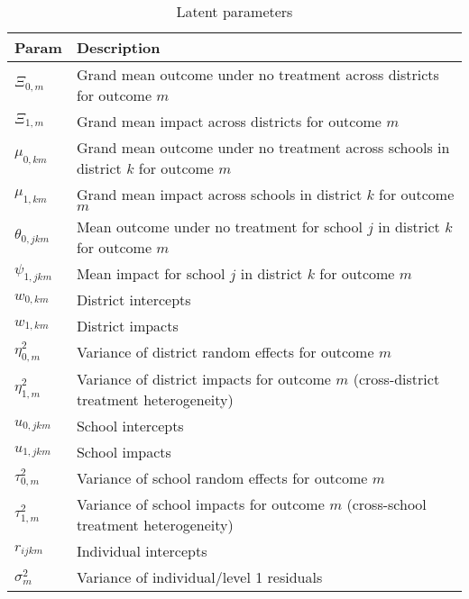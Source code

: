 \documentclass[12pt]{article}
\begin{document}
\begin{table}[p]
\begin{tabular}{p{1.5cm} | p{16cm}}
Param											& Description \\ \hline
$\Xi_{0,m}$ 									& Grand mean outcome under no treatment across districts for outcome $m$\\
$\Xi_{1,m}$										& Grand mean impact across districts for outcome $m$\\
$\mu_{0,km}$									& Grand mean outcome under no treatment across schools in district $k$ for outcome $m$\\
$\mu_{1,km}$									& Grand mean impact across schools in district $k$ for outcome $m$\\
$\theta_{0,jkm}$								& Mean outcome under no treatment for school $j$ in district $k$ for outcome $m$\\
$\psi_{1,jkm}$									& Mean impact for school $j$ in district $k$ for outcome $m$\\ \hline
$w_{0,km}$										& District intercepts\\
$w_{1,km}$										& District impacts \\
$\eta^2_{0,m}$									& Variance of district random effects for outcome $m$ \\
$\eta^2_{1,m}$									& Variance of district impacts for outcome $m$ (cross-district treatment heterogeneity) \\ \hline
$u_{0,jkm}$										& School intercepts\\
$u_{1,jkm}$										& School impacts \\
$\tau^2_{0,m}$									& Variance of school random effects for outcome $m$ \\
$\tau^2_{1,m}$									& Variance of school impacts for outcome $m$ (cross-school treatment heterogeneity) \\ \hline
$r_{ijkm}$										& Individual intercepts \\
$\sigma^2_{m}$									& Variance of individual/level 1 residuals \\
\end{tabular}
\caption{Latent parameters\label{tab:latent_param}}
\end{table}
\end{document}
